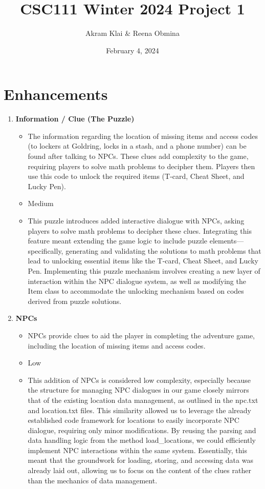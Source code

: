 \documentclass[11pt]{article}
\title{\textbf{CSC111 Winter 2024 Project 1}}
\author{Akram Klai \& Reena Obmina}
\date{February 4, 2024}
\begin{document}
\maketitle

\section*{Enhancements}


\begin{enumerate}

\item \textbf{Information / Clue (The Puzzle)}
	\begin{itemize}
	\item The information regarding the location of missing items and access codes (to lockers at Goldring, locks in a stash, and a phone number) can be found after talking to NPCs. These clues add complexity to the game, requiring players to solve math problems to decipher them. Players then use this code to unlock the required items (T-card, Cheat Sheet, and Lucky Pen).
	\item Medium
	\item This puzzle introduces added interactive dialogue with NPCs, asking players to solve math problems to decipher these clues. Integrating this feature meant extending the game logic to include puzzle elements—specifically, generating and validating the solutions to math problems that lead to unlocking essential items like the T-card, Cheat Sheet, and Lucky Pen. Implementing this puzzle mechanism involves creating a new layer of interaction within the NPC dialogue system, as well as modifying the Item class to accommodate the unlocking mechanism based on codes derived from puzzle solutions.
 	\end{itemize}
\item \textbf{NPCs}
	\begin{itemize}
	\item NPCs provide clues to aid the player in completing the adventure game, including the location of missing items and access codes.
	\item Low
	\item This addition of NPCs is considered low complexity, especially because the structure for managing NPC dialogues in our game closely mirrors that of the existing location data management, as outlined in the npc.txt and location.txt files. This similarity allowed us to leverage the already established code framework for locations to easily incorporate NPC dialogue, requiring only minor modifications. By reusing the parsing and data handling logic from the method load\_locations, we could efficiently implement NPC interactions within the same system. Essentially, this meant that the groundwork for loading, storing, and accessing data was already laid out, allowing us to focus on the content of the clues rather than the mechanics of data management.

\end{itemize}
\end{enumerate}
\end{document}
